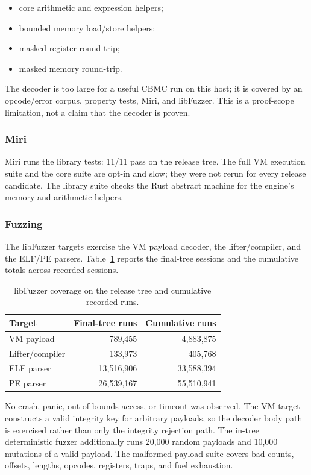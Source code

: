 \begin{itemize}
  \item core arithmetic and expression helpers;
  \item bounded memory load/store helpers;
  \item masked register round-trip;
  \item masked memory round-trip.
\end{itemize}

The decoder is too large for a useful CBMC run on this host; it is covered by an
opcode/error corpus, property tests, Miri, and libFuzzer. This is a proof-scope
limitation, not a claim that the decoder is proven.

\subsubsection{Miri}

Miri runs the  library tests: 11/11 pass on the release tree. The
full VM execution suite and the core suite are opt-in and slow; they were not
rerun for every release candidate. The library suite checks the Rust abstract
machine for the engine's memory and arithmetic helpers.

\subsubsection{Fuzzing}

The libFuzzer targets exercise the VM payload decoder, the lifter/compiler, and
the ELF/PE parsers. Table~\ref{tab:fuzz} reports the final-tree sessions and the
cumulative totals across recorded sessions.

\begin{table}[htbp]
\centering
\small
\caption{libFuzzer coverage on the release tree and cumulative recorded runs.}
\label{tab:fuzz}
\begin{tabular}{@{}lrr@{}}
\toprule
Target & Final-tree runs & Cumulative runs \\
\midrule
VM payload & 789,455 & 4,883,875 \\
Lifter/compiler & 133,973 & 405,768 \\
ELF parser & 13,516,906 & 33,588,394 \\
PE parser & 26,539,167 & 55,510,941 \\
\bottomrule
\end{tabular}
\end{table}

No crash, panic, out-of-bounds access, or timeout was observed. The VM target
constructs a valid integrity key for arbitrary payloads, so the decoder body path
is exercised rather than only the integrity rejection path. The in-tree
deterministic fuzzer additionally runs 20,000 random payloads and 10,000
mutations of a valid payload. The malformed-payload suite covers bad counts,
offsets, lengths, opcodes, registers, traps, and fuel exhaustion.

